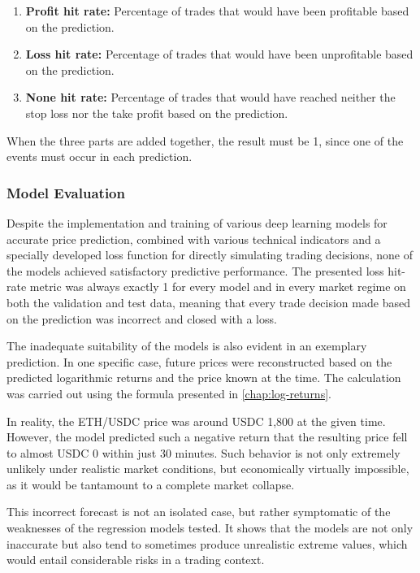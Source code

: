 \begin{enumerate}
    \item \textbf{Profit hit rate:} Percentage of trades that would have been profitable based on the prediction.
    \item \textbf{Loss hit rate:} Percentage of trades that would have been unprofitable based on the prediction.
    \item \textbf{None hit rate:} Percentage of trades that would have reached neither the stop loss nor the take profit based on the prediction.
\end{enumerate}

\noindent
When the three parts are added together, the result must be 1, since one of the events must occur in each prediction.

\subsubsection{Model Evaluation}
\label{chap:regression-models-evaluation}

Despite the implementation and training of various deep learning models for accurate price prediction, combined with various technical indicators and a specially developed loss function for directly simulating trading decisions, none of the models achieved satisfactory predictive performance.
The presented loss hit-rate metric was always exactly 1 for every model and in every market regime on both the validation and test data, meaning that every trade decision made based on the prediction was incorrect and closed with a loss.

The inadequate suitability of the models is also evident in an exemplary prediction.
In one specific case, future prices were reconstructed based on the predicted logarithmic returns and the price known at the time.
The calculation was carried out using the formula presented in \autoref{chap:log-returns}.

In reality, the ETH/USDC price was around USDC 1,800 at the given time.
However, the model predicted such a negative return that the resulting price fell to almost USDC 0 within just 30 minutes.
Such behavior is not only extremely unlikely under realistic market conditions, but economically virtually impossible, as it would be tantamount to a complete market collapse.

This incorrect forecast is not an isolated case, but rather symptomatic of the weaknesses of the regression models tested.
It shows that the models are not only inaccurate but also tend to sometimes produce unrealistic extreme values, which would entail considerable risks in a trading context.

